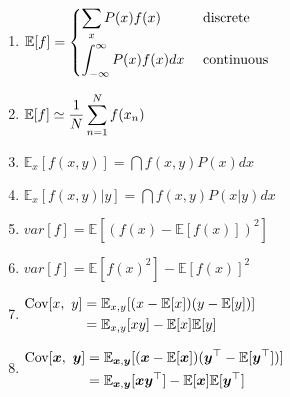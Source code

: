 \begin{multicols}{2}
\begin{enumerate}[series=rvrules]
    \item
    $
        \mathbb{E}[f] =
        \begin{cases}
            \displaystyle\sum_x P(x)f(x) & \text{ discrete} \\[0.4cm]
            \displaystyle\int_{-\infty}^\infty P(x)f(x)dx & \text{ continuous} \\
        \end{cases}
    $
    \hfill \cite{ml/book/Pattern-Recognition-And-Machine-Learning/Christopher-M-Bishop}

    \item
    $
        \mathbb{E}[f] \simeq
        \dfrac{1}{N} \displaystyle\sum_{n=1}^N f(x_n)
    $
    \hfill \cite{ml/book/Pattern-Recognition-And-Machine-Learning/Christopher-M-Bishop}

    \item
    $
        \mathbb{E}_x[f(x, y)]
        = \dint f(x,y) P(x) dx
    $
    \hfill \cite{ml/book/Pattern-Recognition-And-Machine-Learning/Christopher-M-Bishop}

    \item
    $
        \mathbb{E}_x[f(x, y)|y]
        = \dint f(x,y) P(x|y) dx
    $
    \hfill \cite{ml/book/Pattern-Recognition-And-Machine-Learning/Christopher-M-Bishop}

    \item
    $
        var[f] = \mathbb{E}[(f(x) - \mathbb{E}[f(x)])^2]
    $
    \hfill \cite{ml/book/Pattern-Recognition-And-Machine-Learning/Christopher-M-Bishop}

    \item
    $
        var[f] = \mathbb{E}[f(x)^2] - \mathbb{E}[f(x)]^2
    $
    \hfill \cite{ml/book/Pattern-Recognition-And-Machine-Learning/Christopher-M-Bishop}

    \item
    $
        \begin{aligned}
            \text{Cov}[x,\ y]
                & = \mathbb{E}_{x,y} [(x - \mathbb{E}[x]) (y - \mathbb{E}[y])] \\
                & = \mathbb{E}_{x,y} [xy] - \mathbb{E}[x]\mathbb{E}[y]
        \end{aligned}
    $
    \hfill \cite{ml/book/Pattern-Recognition-And-Machine-Learning/Christopher-M-Bishop}

    \item
    $
        \begin{aligned}
            \text{Cov}[\bm{x},\ \bm{y}]
                & = \mathbb{E}_{\bm{x},\bm{y}} [(\bm{x} - \mathbb{E}[\bm{x}]) (\bm{y}^\top - \mathbb{E}[\bm{y}^\top])] \\
                & = \mathbb{E}_{\bm{x},\bm{y}} [\bm{xy}^\top] - \mathbb{E}[\bm{x}]\mathbb{E}[\bm{y}^\top]
        \end{aligned}
    $
    \hfill \cite{ml/book/Pattern-Recognition-And-Machine-Learning/Christopher-M-Bishop}


\end{enumerate}
\end{multicols}
